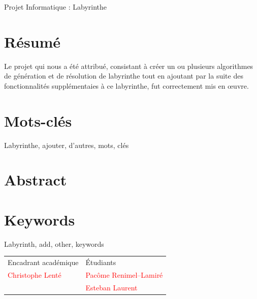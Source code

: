 \documentclass[12pt]{scrreprt} %
\begin{document}
\newpage

\begin{center}
    \Huge
    Projet Informatique : Labyrinthe
\end{center}

\section*{Résumé}

Le projet qui nous a été attribué, consistant à créer un ou plusieurs algorithmes de génération et de résolution de labyrinthe tout en ajoutant par la suite des fonctionnalités supplémentaies à ce labyrinthe, fut correctement mis en œuvre.

\section*{Mots-clés}

Labyrinthe, ajouter, d'autres, mots, clés

\section*{Abstract}
\blindtext

\section*{Keywords}

Labyrinth, add, other, keywords

\hrulefill

\vfill


\begin{table}[h]
    \begin{tabularx}{\textwidth}{|X|Y|}
        \hline
        Encadrant académique              & Étudiants                               \\
        \textcolor{red}{Christophe Lenté} & \textcolor{red}{Pacôme Renimel--Lamiré} \\
                                          & \textcolor{red}{Esteban Laurent}        \\
        \hline
    \end{tabularx}
\end{table}
\end{document}
